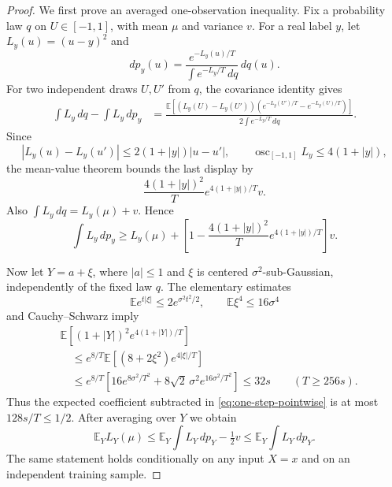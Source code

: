 \begin{proof}
We first prove an averaged one-observation inequality. Fix a probability
law $q$ on $U\in[-1,1]$, with mean $\mu$ and variance $v$. For a real
label $y$, let $L_y(u)=(u-y)^2$ and
\[
 dp_y(u)=\frac{e^{-L_y(u)/T}}{\int e^{-L_y/T}\,dq}\,dq(u).
\]
For two independent draws $U,U'$ from $q$, the covariance identity gives
\begin{align*}
 \int L_y\,dq-\int L_y\,dp_y
 &=\frac{\mathbb E[(L_y(U)-L_y(U'))
         (e^{-L_y(U')/T}-e^{-L_y(U)/T})]}{2\int e^{-L_y/T}\,dq}.
\end{align*}
Since
\[
 |L_y(u)-L_y(u')|\le2(1+|y|)|u-u'|,
 \qquad \operatorname{osc}_{[-1,1]}L_y\le4(1+|y|),
\]
the mean-value theorem bounds the last display by
\[
 \frac{4(1+|y|)^2}{T}
       e^{4(1+|y|)/T}v.
\]
Also $\int L_y\,dq=L_y(\mu)+v$. Hence
\begin{equation}
 \int L_y\,dp_y\ge L_y(\mu)+
 \left[1-\frac{4(1+|y|)^2}{T}e^{4(1+|y|)/T}\right]v.
 \label{eq:one-step-pointwise}
\end{equation}

Now let $Y=a+\xi$, where $|a|\le1$ and $\xi$ is centered
$\sigma^2$-sub-Gaussian, independently of the fixed law $q$.
The elementary estimates
\[
 \mathbb E e^{t|\xi|}\le2e^{\sigma^2t^2/2},
 \qquad \mathbb E\xi^4\le16\sigma^4
\]
and Cauchy--Schwarz imply
\begin{align*}
 &\mathbb E\left[(1+|Y|)^2e^{4(1+|Y|)/T}\right]\\
 &\quad\le e^{8/T}
       \mathbb E[(8+2\xi^2)e^{4|\xi|/T}]\\
 &\quad\le e^{8/T}
       \left[16e^{8\sigma^2/T^2}
              +8\sqrt2\,\sigma^2e^{16\sigma^2/T^2}\right]
 \le32s
 \qquad(T\ge256s).
\end{align*}
Thus the expected coefficient subtracted in
\eqref{eq:one-step-pointwise} is at most $128s/T\le1/2$.
After averaging over $Y$ we obtain
\begin{equation}
 \mathbb E_Y L_Y(\mu)
 \le\mathbb E_Y\int L_Y\,dp_Y-\tfrac12v
 \le\mathbb E_Y\int L_Y\,dp_Y.
 \label{eq:averaged-one-step}
\end{equation}
The same statement holds conditionally on any input $X=x$ and on an
independent training sample.


\end{proof}
